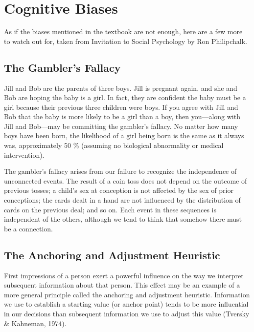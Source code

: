 \documentclass[
]{book}
\begin{document}
\hypertarget{cognitive-biases}{%
\section{Cognitive Biases}\label{cognitive-biases}}

As if the biases mentioned in the textbook are not enough, here are a few more to watch out for, taken from Invitation to Social Psychology by Ron Philipchalk.

\hypertarget{the-gamblers-fallacy}{%
\subsection*{The Gambler's Fallacy}\label{the-gamblers-fallacy}}

Jill and Bob are the parents of three boys. Jill is pregnant again, and she and Bob are hoping the baby is a girl. In fact, they are confident the baby must be a girl because their previous three children were boys. If you agree with Jill and Bob that the baby is more likely to be a girl than a boy, then you---along with Jill and Bob---may be committing the gambler's fallacy. No matter how many boys have been born, the likelihood of a girl being born is the same as it always was, approximately 50 \% (assuming no biological abnormality or medical intervention).

The gambler's fallacy arises from our failure to recognize the independence of unconnected events. The result of a coin toss does not depend on the outcome of previous tosses; a child's sex at conception is not affected by the sex of prior conceptions; the cards dealt in a hand are not influenced by the distribution of cards on the previous deal; and so on. Each event in these sequences is independent of the others, although we tend to think that somehow there must be a connection.

\hypertarget{the-anchoring-and-adjustment-heuristic}{%
\subsection*{The Anchoring and Adjustment Heuristic}\label{the-anchoring-and-adjustment-heuristic}}

First impressions of a person exert a powerful influence on the way we interpret subsequent information about that person. This effect may be an example of a more general principle called the anchoring and adjustment heuristic. Information we use to establish a starting value (or anchor point) tends to be more influential in our decisions than subsequent information we use to adjust this value (Tversky \& Kahneman, 1974).
\end{document}
